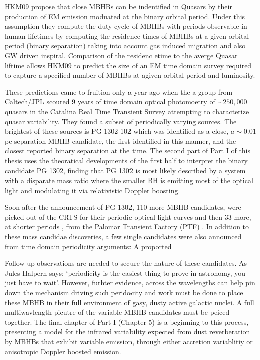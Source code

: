 HKM09 propose that close MBHBs can be indentified in Quasars by their production of EM emission moduated at the binary orbital period. Under this assumption they compute the duty cycle of MBHBs with periods observable in human lifetimes by computing the residence times of MBHBs at a given orbital period (binary separation) taking into account gas induced migration and also GW driven inspiral. Comparison of the residenc etime to the averge Quasar liftime allows HKM09 to predict the size of an EM time domain survey required to capture a specified number of MBHBs at agiven orbital period and luminosity.






These predictions came to fruition only a year ago when the a group from
Caltech/JPL scoured 9 years of time domain optical photomoetry of
$\sim250,000$ quasars in the Catalina Real Time Transient Survey \citep{CRTSrefs} attempting to characterize quasar variability. They found a subset of
periodically varying sources. The brightest of these sources is PG 1302-102
which was identified as a close, $a \sim 0.01$pc separation MBHB candidate,
the first identified in this manner, and the closest reported binary
separation at the time. The second part of Part I of this thesis uses the
theoratical developments of the first half to interpret the binary candidate
PG 1302, finding that PG 1302 is most likely described by a system with a
disparate mass ratio where the smaller BH is emitting most of the optical
light and modulating it via relativistic Doppler boosting.


Soon after the announcement of PG 1302, 110 more MBHB candidates, were picked
out of the CRTS for their periodic optical light curves \citep{Graham:2015b}
and then 33 more, at shorter periods \citep{CharisiMBHBs:2016}, from the
Palomar Transient Factory (PTF) \citep{PTF}. In addition to these mass candidae
discoveries, a few single candidates were also announced from time domain periodicity arguments: A proported 


Follow up observations are needed to secure the nature of these candidates. As
Jules Halpern says: `periodicity is the easiest thing to prove in astronomy,
you just have to wait'. However, furhter evidence, across the
wavelengths can help pin down the mechanism driving such peridocity and work
must be done to place these MBHB in their full environment of gasy, dusty
active galactic nuclei. A full multiwavlength picutre of the variable MBHB
candidates must be peiced together. The final chapter of Part I (Chapter 5) is
a beginning to this process, presenting a model for the infrared variability
expected from dust reverberation by MBHBs that exhibit variable emission,
through either accretion variablitiy or anisotropic Doppler boosted emission.









